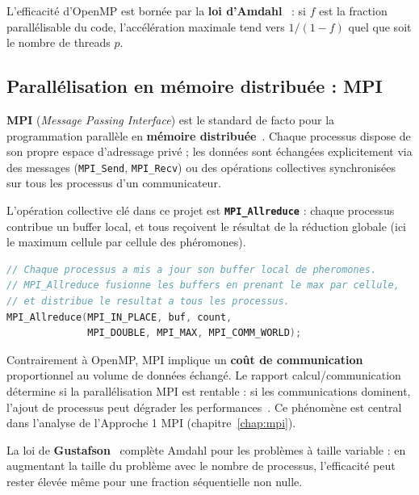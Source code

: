 L'efficacité d'OpenMP est bornée par la \textbf{loi d'Amdahl}~\cite{amdahl1967validity} :
si $f$ est la fraction parallélisable du code, l'accélération maximale tend vers
$1/(1-f)$ quel que soit le nombre de threads $p$.

\subsection{Parallélisation en mémoire distribuée : MPI}

\textbf{MPI} (\textit{Message Passing Interface}) est le standard de facto pour la
programmation parallèle en \textbf{mémoire distribuée}~\cite{mpi31}. Chaque processus
dispose de son propre espace d'adressage privé ; les données sont échangées
explicitement via des messages (\texttt{MPI\_Send}, \texttt{MPI\_Recv}) ou des
opérations collectives synchronisées sur tous les processus d'un communicateur.

L'opération collective clé dans ce projet est \textbf{\texttt{MPI\_Allreduce}} :
chaque processus contribue un buffer local, et tous reçoivent le résultat de la
réduction globale (ici le maximum cellule par cellule des phéromones).

\begin{lstlisting}[language=C++, caption={Synchronisation globale des phéromones via MPI}]
// Chaque processus a mis a jour son buffer local de pheromones.
// MPI_Allreduce fusionne les buffers en prenant le max par cellule,
// et distribue le resultat a tous les processus.
MPI_Allreduce(MPI_IN_PLACE, buf, count,
              MPI_DOUBLE, MPI_MAX, MPI_COMM_WORLD);
\end{lstlisting}

Contrairement à OpenMP, MPI implique un \textbf{coût de communication} proportionnel
au volume de données échangé. Le rapport calcul/communication détermine si la
parallélisation MPI est rentable : si les communications dominent, l'ajout de
processus peut dégrader les performances~\cite{gropp1999mpi}. Ce phénomène est
central dans l'analyse de l'Approche 1 MPI (chapitre~\ref{chap:mpi}).

La loi de \textbf{Gustafson}~\cite{gustafson1988reevaluating} complète Amdahl
pour les problèmes à taille variable : en augmentant la taille du problème avec
le nombre de processus, l'efficacité peut rester élevée même pour une fraction
séquentielle non nulle.




